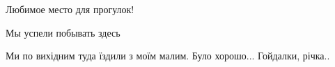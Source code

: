  
 
 
 
 

\qqSecCmt


Любимое место для прогулок!💜💜💜


Мы успели побывать здесь


Ми по вихідним туда їздили з моїм малим. Було хорошо... Гойдалки, річка..
